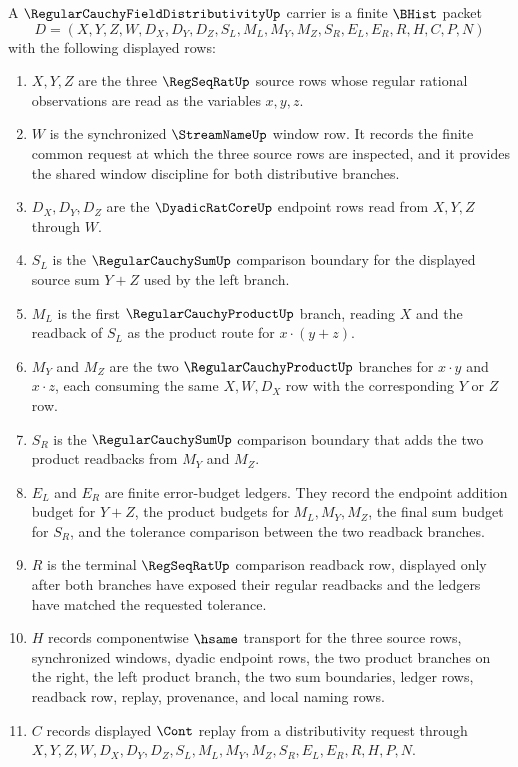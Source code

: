 \begin{definition}
\label{def:regular-cauchy-field-distributivity-carrier}
A $\RegularCauchyFieldDistributivityUp$ carrier is a finite $\BHist$ packet
$$
D=(X,Y,Z,W,D_X,D_Y,D_Z,S_L,M_L,M_Y,M_Z,S_R,E_L,E_R,R,H,C,P,N)
$$
with the following displayed rows:
\begin{enumerate}
\item $X,Y,Z$ are the three $\RegSeqRatUp$ source rows whose regular rational observations are read as the variables $x,y,z$.
\item $W$ is the synchronized $\StreamNameUp$ window row. It records the finite common request at which the three source rows are inspected, and it provides the shared window discipline for both distributive branches.
\item $D_X,D_Y,D_Z$ are the $\DyadicRatCoreUp$ endpoint rows read from $X,Y,Z$ through $W$.
\item $S_L$ is the $\RegularCauchySumUp$ comparison boundary for the displayed source sum $Y+Z$ used by the left branch.
\item $M_L$ is the first $\RegularCauchyProductUp$ branch, reading $X$ and the readback of $S_L$ as the product route for $x\cdot(y+z)$.
\item $M_Y$ and $M_Z$ are the two $\RegularCauchyProductUp$ branches for $x\cdot y$ and $x\cdot z$, each consuming the same $X,W,D_X$ row with the corresponding $Y$ or $Z$ row.
\item $S_R$ is the $\RegularCauchySumUp$ comparison boundary that adds the two product readbacks from $M_Y$ and $M_Z$.
\item $E_L$ and $E_R$ are finite error-budget ledgers. They record the endpoint addition budget for $Y+Z$, the product budgets for $M_L,M_Y,M_Z$, the final sum budget for $S_R$, and the tolerance comparison between the two readback branches.
\item $R$ is the terminal $\RegSeqRatUp$ comparison readback row, displayed only after both branches have exposed their regular readbacks and the ledgers have matched the requested tolerance.
\item $H$ records componentwise $\hsame$ transport for the three source rows, synchronized windows, dyadic endpoint rows, the two product branches on the right, the left product branch, the two sum boundaries, ledger rows, readback row, replay, provenance, and local naming rows.
\item $C$ records displayed $\Cont$ replay from a distributivity request through $X,Y,Z,W,D_X,D_Y,D_Z,S_L,M_L,M_Y,M_Z,S_R,E_L,E_R,R,H,P,N$.

\end{enumerate}
\end{definition}
